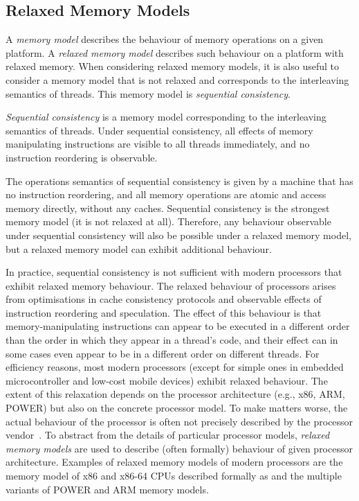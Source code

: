 \subsection{Relaxed Memory Models}

A \emph{memory model} describes the behaviour of memory operations on a given platform.
A \emph{relaxed memory model} describes such behaviour on a platform with relaxed memory.
When considering relaxed memory models, it is also useful to consider a memory
model that is not relaxed and corresponds to the interleaving semantics of
threads.
This memory model is \emph{sequential consistency}.

\begin{definition}
    \emph{Sequential consistency} is a memory model corresponding to the
    interleaving semantics of threads.
    Under sequential consistency, all effects of memory manipulating
    instructions are visible to all threads immediately, and no instruction
    reordering is observable.
\end{definition}

The operations semantics of sequential consistency is given by a machine that has no instruction reordering, and all memory operations are atomic and access memory directly, without any caches.
Sequential consistency is the strongest memory model (it is not relaxed at all).
Therefore, any behaviour observable under sequential consistency will also be possible under a relaxed memory model, but a relaxed memory model can exhibit additional behaviour.

In practice, sequential consistency is not sufficient with modern processors
that exhibit relaxed memory behaviour.
The relaxed behaviour of processors arises from optimisations in cache
consistency protocols and observable effects of instruction reordering and
speculation.
The effect of this behaviour is that memory-manipulating instructions can appear
to be executed in a different order than the order in which they appear in a
thread's code, and their effect can in some cases even appear to be in
a different order on different threads.
For efficiency reasons, most modern processors (except for simple ones in
embedded microcontroller and low-cost mobile devices) exhibit relaxed behaviour.
The extent of this relaxation depends on the processor architecture (e.g.,
x86, ARM, POWER) but also on the concrete processor model.
To make matters worse, the actual behaviour of the processor is often not
precisely described by the processor vendor~.
To abstract from the details of particular processor models, \emph{relaxed
memory models} are used to describe (often formally) behaviour of given
processor architecture.
Examples of relaxed memory models of modern processors are the memory model of
x86 and x86-64 CPUs described formally as \xtso {} and the multiple
variants of POWER  and
ARM  memory models.

